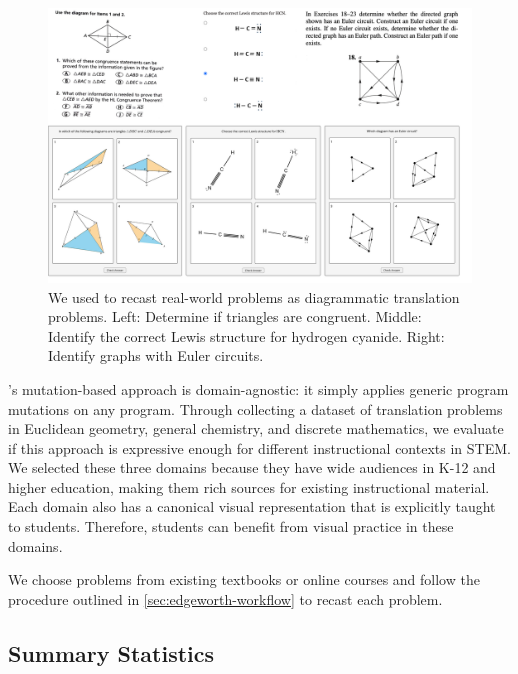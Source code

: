 \begin{figure}
    \centering
    \includegraphics[width=\linewidth]{assets/edgeworth/problem-samples.pdf}
    \caption{We used \Edgeworth to recast real-world problems as diagrammatic translation problems. Left: \textmd{Determine if triangles are congruent.}  Middle: \textmd{Identify the correct Lewis structure for hydrogen cyanide.} Right: \textmd{Identify graphs with Euler circuits.}}
    \label{fig:edgeworth-problems}
\end{figure}

\Edgeworth's mutation-based approach is domain-agnostic: it simply applies generic program mutations on any \Substance program. Through collecting a dataset of translation problems in Euclidean geometry, general chemistry, and discrete mathematics, we evaluate if this approach is expressive enough for different instructional contexts in STEM. We selected these three domains because they have wide audiences in K-12 and higher education, making them rich sources for existing instructional material. Each domain also has a canonical visual representation that is explicitly taught to students. Therefore, students can benefit from visual practice in these domains.

We choose problems from existing textbooks or online courses and follow the procedure outlined in \cref{sec:edgeworth-workflow} to recast each problem. 


\subsection{Summary Statistics}
\label{sec:edgeworth-case-studies-summary}

